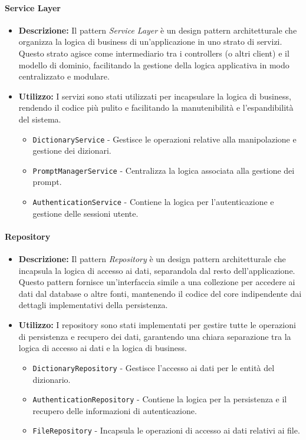 \paragraph{Service Layer}
\begin{itemize}
    \item{\textbf{Descrizione:}} Il pattern \textit{Service Layer} è un design pattern architetturale che organizza la logica di business di un'applicazione in uno strato di servizi. Questo strato agisce come intermediario tra i controllers (o altri client) e il modello di dominio, facilitando la gestione della logica applicativa in modo centralizzato e modulare.
    \item{\textbf{Utilizzo:}} I servizi sono stati utilizzati per incapsulare la logica di business, rendendo il codice più pulito e facilitando la manutenibilità e l'espandibilità del sistema.
    \begin{itemize}
        \item \texttt{DictionaryService} - Gestisce le operazioni relative alla manipolazione e gestione dei dizionari.
        \item \texttt{PromptManagerService} - Centralizza la logica associata alla gestione dei prompt.
        \item \texttt{AuthenticationService} - Contiene la logica per l'autenticazione e gestione delle sessioni utente.
    \end{itemize}
\end{itemize}

\paragraph{Repository}
\begin{itemize}
    \item{\textbf{Descrizione:}} Il pattern \textit{Repository} è un design pattern architetturale che incapsula la logica di accesso ai dati, separandola dal resto dell'applicazione. Questo pattern fornisce un'interfaccia simile a una collezione per accedere ai dati dal database o altre fonti, mantenendo il codice del core indipendente dai dettagli implementativi della persistenza.
    \item{\textbf{Utilizzo:}} I repository sono stati implementati per gestire tutte le operazioni di persistenza e recupero dei dati, garantendo una chiara separazione tra la logica di accesso ai dati e la logica di business.
    \begin{itemize}
        \item \texttt{DictionaryRepository} - Gestisce l'accesso ai dati per le entità del dizionario.
        \item \texttt{AuthenticationRepository} - Contiene la logica per la persistenza e il recupero delle informazioni di autenticazione.
        \item \texttt{FileRepository} - Incapsula le operazioni di accesso ai dati relativi ai file.
    \end{itemize}
\end{itemize}
